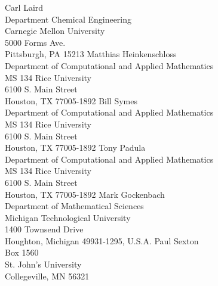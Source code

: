 \documentclass[pdf,ps2pdf,11pt]{SANDreport}
\begin{document}
%
%


%
\begin{SANDdistribution}
%

 Carl Laird \\ Department Chemical Engineering\\Carnegie Mellon University\\5000 Forms Ave.\\Pittsburgh, PA 15213
 Matthias Heinkenschloss \\ Department of Computational and Applied Mathematics\\MS 134 Rice University\\
6100 S. Main Street\\Houston, TX 77005-1892
 Bill Symes\\Department of Computational and Applied Mathematics\\MS 134 Rice University\\
6100 S. Main Street\\Houston, TX 77005-1892
 Tony Padula\\Department of Computational and Applied Mathematics\\MS 134 Rice University\\
6100 S. Main Street\\Houston, TX 77005-1892
 Mark Gockenbach \\ Department of Mathematical Sciences\\Michigan Technological University\\ 
1400 Townsend Drive\\Houghton, Michigan 49931-1295, U.S.A.
 Paul Sexton \\ Box 1560 \\ St. John's University \\ Collegeville, MN 56321

\end{SANDdistribution}
\end{document}
